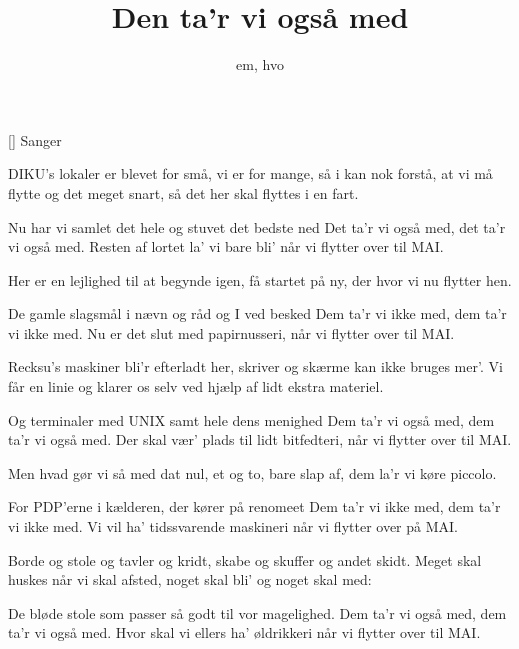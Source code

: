 \documentclass[a4paper,11pt]{article}
\title{Den ta'r vi også med}
\author{em, hvo}
\begin{document}
\maketitle

\begin{roles}
[] Sanger
\end{roles}

\begin{song}
     DIKU's lokaler er blevet for små,
              vi er for mange, så i kan nok forstå,
              at vi må flytte og det meget snart,
              så det her skal flyttes i en fart.

     Nu har vi samlet det hele og stuvet det bedste ned
              Det ta'r vi også med, det ta'r vi også med.
              Resten af lortet la' vi bare bli'
              når vi flytter over til MAI.

     Her er en lejlighed til at begynde igen,
              få startet på ny, der hvor vi nu flytter hen.

     De gamle slagsmål i nævn og råd og I ved besked
              Dem ta'r vi ikke med, dem ta'r vi ikke med.
              Nu er det slut med papirnusseri,
              når vi flytter over til MAI.

     Recksu's maskiner bli'r efterladt her,
              skriver og skærme kan ikke bruges mer'.
              Vi får en linie og klarer os selv
              ved hjælp af lidt ekstra materiel.

     Og terminaler med UNIX samt hele dens menighed
              Dem ta'r vi også med, dem ta'r vi også med.
              Der skal vær' plads til lidt bitfedteri,
              når vi flytter over til MAI.

     Men hvad gør vi så med dat nul, et og to,
              bare slap af, dem la'r vi køre piccolo.

     For PDP'erne i kælderen, der kører på renomeet
              Dem ta'r vi ikke med, dem ta'r vi ikke med.
              Vi vil ha' tidssvarende maskineri
              når vi flytter over på MAI.

     Borde og stole og tavler og kridt,
              skabe og skuffer og andet skidt.
              Meget skal huskes når vi skal afsted,
              noget skal bli' og noget skal med:

     De bløde stole som passer så godt til vor magelighed.
              Dem ta'r vi også med, dem ta'r vi også med.
              Hvor skal vi ellers ha' øldrikkeri
              når vi flytter over til MAI.


\end{song}
\end{document}
